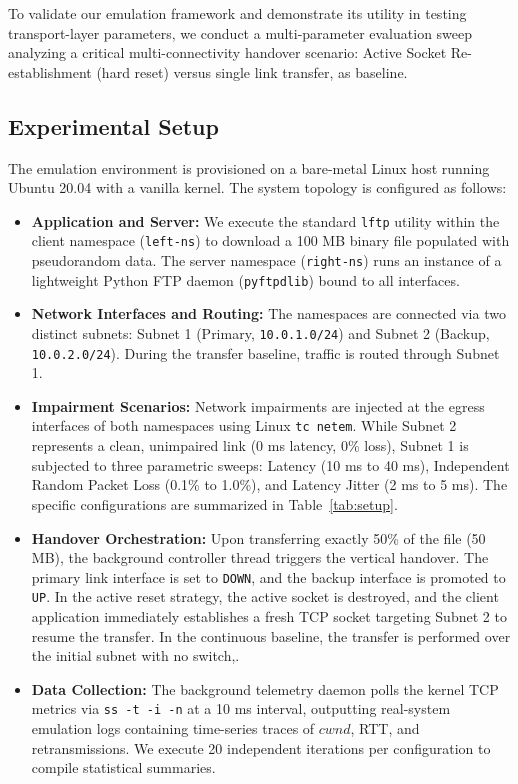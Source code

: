 \documentclass[conference]{IEEEtran}
\begin{document}
To validate our emulation framework and demonstrate its utility in testing transport-layer parameters, we conduct a multi-parameter evaluation sweep analyzing a critical multi-connectivity handover scenario: Active Socket Re-establishment (hard reset) versus single link transfer, as baseline.

\subsection{Experimental Setup}
The emulation environment is provisioned on a bare-metal Linux host running Ubuntu 20.04 with a vanilla kernel. The system topology is configured as follows:
\begin{itemize}
    \item \textbf{Application and Server:} We execute the standard \texttt{lftp} utility within the client namespace (\texttt{left-ns}) to download a 100 MB binary file populated with pseudorandom data. The server namespace (\texttt{right-ns}) runs an instance of a lightweight Python FTP daemon (\texttt{pyftpdlib}) bound to all interfaces.
    \item \textbf{Network Interfaces and Routing:} The namespaces are connected via two distinct subnets: Subnet 1 (Primary, \texttt{10.0.1.0/24}) and Subnet 2 (Backup, \texttt{10.0.2.0/24}). During the transfer baseline, traffic is routed through Subnet 1. 
    \item \textbf{Impairment Scenarios:} Network impairments are injected at the egress interfaces of both namespaces using Linux \texttt{tc netem}. While Subnet 2 represents a clean, unimpaired link (0 ms latency, 0\% loss), Subnet 1 is subjected to three parametric sweeps: Latency (10 ms to 40 ms), Independent Random Packet Loss (0.1\% to 1.0\%), and Latency Jitter (2 ms to 5 ms). The specific configurations are summarized in Table~\ref{tab:setup}.
    \item \textbf{Handover Orchestration:} Upon transferring exactly 50\% of the file (50 MB), the background controller thread triggers the vertical handover. The primary link interface is set to \texttt{DOWN}, and the backup interface is promoted to \texttt{UP}. In the active reset strategy, the active socket is destroyed, and the client application immediately establishes a fresh TCP socket targeting Subnet 2 to resume the transfer. In the continuous baseline, the transfer is performed over the initial subnet with no switch,.
    \item \textbf{Data Collection:} The background telemetry daemon polls the kernel TCP metrics via \texttt{ss -t -i -n} at a 10 ms interval, outputting real-system emulation logs containing time-series traces of $cwnd$, RTT, and retransmissions. We execute 20 independent iterations per configuration to compile statistical summaries.
\end{itemize}
\end{document}
